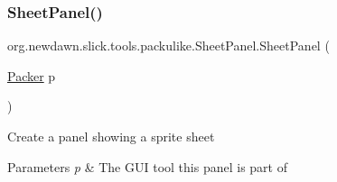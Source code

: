 \subsubsection{\texorpdfstring{Sheet\+Panel()}{SheetPanel()}}
{\footnotesize\ttfamily org.\+newdawn.\+slick.\+tools.\+packulike.\+Sheet\+Panel.\+Sheet\+Panel (\begin{DoxyParamCaption}\item[{\mbox{\hyperlink{classorg_1_1newdawn_1_1slick_1_1tools_1_1packulike_1_1_packer}{Packer}}}]{p }\end{DoxyParamCaption})\hspace{0.3cm}{\ttfamily [inline]}}

Create a panel showing a sprite sheet


\begin{DoxyParams}{Parameters}
{\em p} & The G\+UI tool this panel is part of \\
\hline
\end{DoxyParams}

